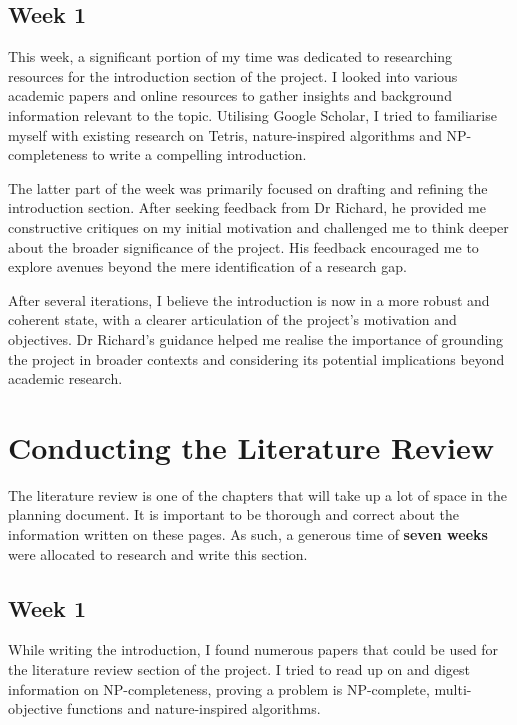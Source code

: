 \documentclass[a4paper, 12pt]{extreport}
\begin{document}
			\subsection{Week 1}
				
				This week, a significant portion of my time was dedicated to researching resources for the introduction section of the project. I looked into various academic papers and online resources to gather insights and background information relevant to the topic. Utilising Google Scholar, I tried to familiarise myself with existing research on Tetris, nature-inspired algorithms and NP-completeness to write a compelling introduction.
				
				The latter part of the week was primarily focused on drafting and refining the introduction section. After seeking feedback from Dr Richard, he provided me constructive critiques on my initial motivation and challenged me to think deeper about the broader significance of the project. His feedback encouraged me to explore avenues beyond the mere identification of a research gap.
				
				After several iterations, I believe the introduction is now in a more robust and coherent state, with a clearer articulation of the project's motivation and objectives. Dr Richard's guidance helped me realise the importance of grounding the project in broader contexts and considering its potential implications beyond academic research.				
				
		\section{Conducting the Literature Review}
		\label{sec:litrev}
		
			The literature review is one of the chapters that will take up a lot of space in the planning document. It is important to be thorough and correct about the information written on these pages. As such, a generous time of \textbf{seven weeks} were allocated to research and write this section.
		
			\subsection{Week 1}
				
				While writing the introduction, I found numerous papers that could be used for the literature review section of the project. I tried to read up on and digest information on NP-completeness, proving a problem is NP-complete, multi-objective functions and nature-inspired algorithms.
				
\end{document}
